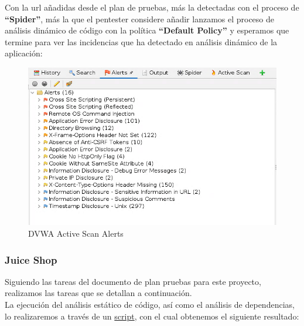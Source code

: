 Con la url añadidas desde el plan de pruebas, más la detectadas con el proceso de \textbf{“Spider”}, más la que el pentester
considere añadir lanzamos el proceso de análisis dinámico de código con  la política \textbf{“Default Policy”} y esperamos
que termine para ver las incidencias que ha detectado en análisis dinámico de la aplicación:

\begin{figure}[!htb]
    \captionsetup{width=1\linewidth}  
    \includegraphics[width=\linewidth]{./imagenes/04_1_2_04_DVWA_ZapProxyActivescanAlerts.png}
    \caption{DVWA Active Scan Alerts}  
    \label{fig:DVWA Active Scan Alerts}
\end{figure}

\newpage

\subsubsection{Juice Shop}
Siguiendo las tareas del documento de plan pruebas para este proyecto, realizamos las tareas que se detallan a continuación.\\

La ejecución del análisis estático de código, así como el análisis de dependencias, lo realizaremos a través de un 
\href{https://github.com/M0l1n3ta/PFG/blob/master/Scripts/STAT/RunSonarScaner_JuiceShop.ps1}{script}, con el cual obtenemos 
el siguiente resultado:\\

